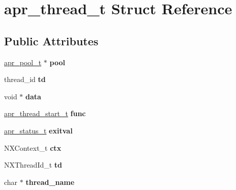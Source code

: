 \hypertarget{structapr__thread__t}{}\section{apr\+\_\+thread\+\_\+t Struct Reference}
\label{structapr__thread__t}
\subsection*{Public Attributes}
\begin{DoxyCompactItemize}
\item 
\mbox{\label{structapr__thread__t_acc06612e8a6404c0d47559be4c8e918d}} 
\mbox{\hyperlink{group__apr__pools_gaf137f28edcf9a086cd6bc36c20d7cdfb}{apr\+\_\+pool\+\_\+t}} $\ast$ {\bfseries pool}
\item 
\mbox{\label{structapr__thread__t_aae7a4bb7692d30e3e4899581a5e87ff0}} 
thread\+\_\+id {\bfseries td}
\item 
\mbox{\label{structapr__thread__t_ab342d8382d9c80234fa19c632230df4f}} 
void $\ast$ {\bfseries data}
\item 
\mbox{\label{structapr__thread__t_ae5f93ab30b3a20eebd707e9a41d9fa98}} 
\mbox{\hyperlink{group__apr__thread__proc_gaa1f88d2a6fe971ac200e466cae5f63e0}{apr\+\_\+thread\+\_\+start\+\_\+t}} {\bfseries func}
\item 
\mbox{\label{structapr__thread__t_a9ec6098badd8bf08b1c8fc7fb3747e44}} 
\mbox{\hyperlink{group__apr__errno_gaf76ee4543247e9fb3f3546203e590a6c}{apr\+\_\+status\+\_\+t}} {\bfseries exitval}
\item 
\mbox{\label{structapr__thread__t_a34de6673457138356c44fbd3dc662904}} 
N\+X\+Context\+\_\+t {\bfseries ctx}
\item 
\mbox{\label{structapr__thread__t_a1c1cf1146c92060226a73836f65cba0b}} 
N\+X\+Thread\+Id\+\_\+t {\bfseries td}
\item 
\mbox{\label{structapr__thread__t_ad255d124aaee44436af04501e5196520}} 
char $\ast$ {\bfseries thread\+\_\+name}

\end{DoxyCompactItemize}
